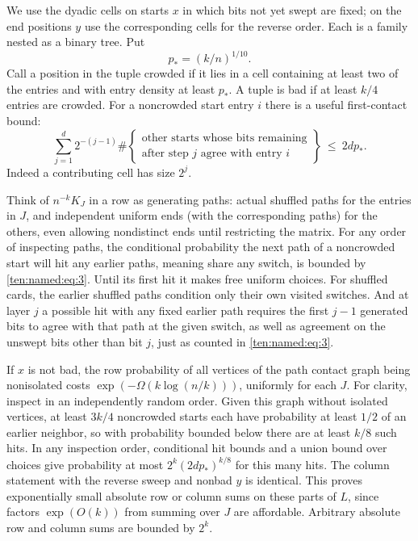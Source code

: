 We use the dyadic cells on starts \(x\) in which bits not yet swept are fixed; on the end positions \(y\) use the corresponding cells for the reverse order. Each is a family nested as a binary tree. Put
\[
 p_*=(k/n)^{1/10}.
\]
Call a position in the tuple crowded if it lies in a cell containing at least two of the entries and with entry density at least \(p_*\). A tuple is bad if at least \(k/4\) entries are crowded. For a noncrowded start entry \(i\) there is a useful first-contact bound:
\begin{equation}
 \sum_{j=1}^d 2^{-(j-1)}
 \#\left\{\begin{array}{l}
       \text{other starts whose bits remaining}\\
       \text{after step }j\text{ agree with entry }i
      \end{array}\right\}\ \le\ 2 d p_*.
 \label{ten:named:eq:3}
\end{equation}
Indeed a contributing cell has size \(2^j\).

Think of \(n^{-k}K_J\) in a row as generating paths: actual shuffled paths for the entries in \(J\), and independent uniform ends (with the corresponding paths) for the others, even allowing nondistinct ends until restricting the matrix. For any order of inspecting paths, the conditional probability the next path of a noncrowded start will hit any earlier paths, meaning share any switch, is bounded by \eqref{ten:named:eq:3}. Until its first hit it makes free uniform choices. For shuffled cards, the earlier shuffled paths condition only their own visited switches. And at layer \(j\) a possible hit with any fixed earlier path requires the first \(j-1\) generated bits to agree with that path at the given switch, as well as agreement on the unswept bits other than bit \(j\), just as counted in \eqref{ten:named:eq:3}.

If \(x\) is not bad, the row probability of all vertices of the path contact graph being nonisolated costs \(\exp(-\Omega(k\log(n/k)))\), uniformly for each \(J\). For clarity, inspect in an independently random order. Given this graph without isolated vertices, at least \(3k/4\) noncrowded starts each have probability at least \(1/2\) of an earlier neighbor, so with probability bounded below there are at least \(k/8\) such hits. In any inspection order, conditional hit bounds and a union bound over choices give probability at most \(2^k(2d p_*)^{k/8}\) for this many hits. The column statement with the reverse sweep and nonbad \(y\) is identical. This proves exponentially small absolute row or column sums on these parts of \(L\), since factors \(\exp(O(k))\) from summing over \(J\) are affordable. Arbitrary absolute row and column sums are bounded by \(2^k\).

